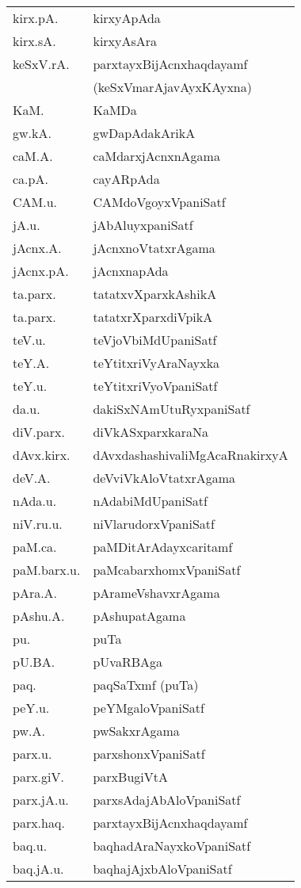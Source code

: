 \begin{longtable}{ll}
kirx.pA. & kirxyApAda\\
kirx.sA. & kirxyAsAra\\
keSxV.rA. & parxtayxBijAcnxhaqdayamf\\
 & (keSxVmarAjavAyxKAyxna)\\
KaM. & KaMDa\\
gw.kA. & gwDapAdakArikA\\
caM.A. & caMdarxjAcnxnAgama\\
ca.pA. & cayARpAda\\
CAM.u. & CAMdoVgoyxVpaniSatf\\
jA.u. & jAbAluyxpaniSatf\\
jAcnx.A. & jAcnxnoVtatxrAgama\\
jAcnx.pA. & jAcnxnapAda\\
ta.parx. & tatatxvXparxkAshikA\\
ta.parx. & tatatxrXparxdiVpikA\\
teV.u. & teVjoVbiMdUpaniSatf\\
teY.A. & teYtitxriVyAraNayxka\\
teY.u. & teYtitxriVyoVpaniSatf\\
da.u. & dakiSxNAmUtuRyxpaniSatf\\
diV.parx. & diVkASxparxkaraNa\\
dAvx.kirx. & dAvxdashashivaliMgAcaRnakirxyA\\
deV.A. & deVviVkAloVtatxrAgama\\
nAda.u. & nAdabiMdUpaniSatf\\
niV.ru.u. & niVlarudorxVpaniSatf\\
paM.ca. & paMDitArAdayxcaritamf\\
paM.barx.u. & paMcabarxhomxVpaniSatf\\
pAra.A. & pArameVshavxrAgama\\
pAshu.A. & pAshupatAgama\\
pu. & puTa\\
pU.BA. & pUvaRBAga\\
paq. & paqSaTxmf (puTa)\\
peY.u. & peYMgaloVpaniSatf\\
pw.A. & pwSakxrAgama\\
parx.u. & parxshonxVpaniSatf\\
parx.giV. & parxBugiVtA\\
parx.jA.u. & parxsAdajAbAloVpaniSatf\\
parx.haq. & parxtayxBijAcnxhaqdayamf\\
baq.u. & baqhadAraNayxkoVpaniSatf\\
baq.jA.u. & baqhajAjxbAloVpaniSatf\\

\end{longtable}
